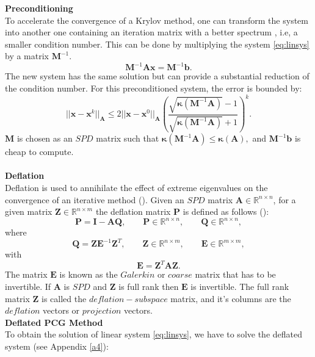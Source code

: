 \documentclass[review]{elsarticle}
\begin{document}
\textbf{Preconditioning}\\
To accelerate the convergence of a Krylov method, one can transform the system into
another one containing an iteration matrix with a better spectrum , i.e, a smaller condition number. 
This can be done by multiplying the system \eqref{eq:linsys} by a matrix $\mathbf{M}^{-1}.$
\begin{equation}\label{eq:precon}
 \mathbf{M}^{-1}\mathbf{A}\mathbf{x}=\mathbf{M}^{-1}\mathbf{b}.
\end{equation}
The new system has the same solution but can provide a substantial reduction of the condition number. 
For this preconditioned system, the error is bounded by:
\begin{equation}\label{eq:convp}
 ||\mathbf{x}-\mathbf{x}^{k}||_\mathbf{A}\leq 2||\mathbf{x}-\mathbf{x}^{0}||_\mathbf{A} 
 \left( \frac{\sqrt{\mathbf{\kappa}(\mathbf{M}^{-1}\mathbf{A})}-1}{\sqrt{\mathbf{\kappa}(\mathbf{M}^{-1}\mathbf{A})}+1} \right)^{k}.
\end{equation}
$\mathbf{M}$ is chosen as an $SPD$ matrix such that $\mathbf{\kappa}(\mathbf{M}^{-1}\mathbf{A})\leq \mathbf{\kappa}(\mathbf{A}),$ and $\mathbf{M}^{-1}\mathbf{b}$ is cheap to compute.\\\\
\textbf{Deflation}\\
Deflation is used to annihilate the effect of extreme eigenvalues on the convergence of an iterative method (\cite{Vuik99}). 
Given an $SPD$ matrix $\mathbf{A} \in \mathbb{R}^{n \times n}$, for a given matrix $\mathbf{Z}\in \mathbb{R}^{n\times m}$ the deflation matrix $\mathbf{P}$ is defined as follows (\cite{Tang08,Tang09}):
$$\mathbf{P}=\mathbf{I}-\mathbf{A}\mathbf{Q}, \qquad \mathbf{P} \in \mathbb{R}^{n \times n}, \qquad \mathbf{Q} \in \mathbb{R}^{n \times n},$$
where
$$\mathbf{Q}=\mathbf{Z}\mathbf{E}^{-1}\mathbf{Z}^T, \qquad \mathbf{Z} \in \mathbb{R}^{n \times m}, \qquad \mathbf{E} \in \mathbb{R}^{m \times m}, $$
with
$$\mathbf{E}=\mathbf{Z}^T\mathbf{A}\mathbf{Z}.$$
The matrix $\mathbf{E}$ is known as the $Galerkin$ or $coarse$ matrix that has to be invertible. 
If $\mathbf{A}$ is $SPD$ and $\mathbf{Z}$ is full rank then $\mathbf{E}$ is invertible. 
The full rank matrix $\mathbf{Z}$ is called the $deflation-subspace$ matrix, 
and it's columns are the
$deflation$ vectors or $projection$ vectors.\\
\textbf{Deflated PCG Method}\\
\hspace{0.5cm}To obtain the solution of linear system \eqref{eq:linsys}, we have to solve the deflated system (see Appendix \ref{a4}):
\end{document}
